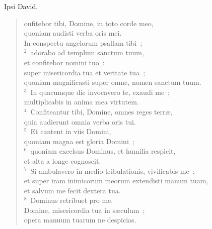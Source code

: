 \bchapter[Psalm]
Ipsi David. \begin{verse}onfitebor tibi, Domine, in toto corde meo,\\ quoniam audisti verba oris mei.\\ In conspectu angelorum psallam tibi~;\\
${}^{2}$~adorabo ad templum sanctum tuum,\\ et confitebor nomini tuo~:\\ super misericordia tua et veritate tua~;\\ quoniam magnificasti super omne, nomen sanctum tuum.\\
${}^{3}$~In quacumque die invocavero te, exaudi me~;\\ multiplicabis in anima mea virtutem.\\
${}^{4}$~Confiteantur tibi, Domine, omnes reges terr\ae ,\\ quia audierunt omnia verba oris tui.\\
${}^{5}$~Et cantent in viis Domini,\\ quoniam magna est gloria Domini~;\\
${}^{6}$~quoniam excelsus Dominus, et humilia respicit,\\ et alta a longe cognoscit.\\
${}^{7}$~Si ambulavero in medio tribulationis, vivificabis me~;\\ et super iram inimicorum meorum extendisti manum tuam,\\ et salvum me fecit dextera tua.\\
${}^{8}$~Dominus retribuet pro me.\\ Domine, misericordia tua in s\ae culum~;\\ opera manuum tuarum ne despicias.\end{verse}



